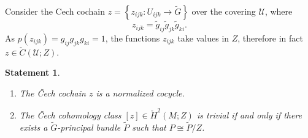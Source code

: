 \documentclass[12pt,letterpaper]{amsart}
\theoremstyle{definition}
\theoremstyle{plain}
\newtheorem{stat}{Statement}
\theoremstyle{remark}
\begin{document}
Consider the Cech cochain $z = \left\{ z_{ijk} : U_{ijk} \to \widetilde{G} \right\}$ over the covering $\mathcal{U}$, where
\begin{equation}
z_{ijk} = \widetilde{g}_{ij} \widetilde{g}_{jk} \widetilde{g}_{ki}.
\label{eq:50}
\end{equation}
As $p(z_{ijk}) = g_{ij} g_{jk} g_{ki} = 1$, the functions $z_{ijk}$ take values in $Z$, therefore in fact $z \in \check{C}(\mathcal{U}; Z)$.
\begin{stat}
\begin{enumerate}
\item
The \v Cech cochain $z$ is a normalized cocycle.
\item
The \v Cech cohomology class $[ z ] \in \check{H}^2(M; Z)$ is trivial if and only if
there exists a $\widetilde{G}$-principal bundle $\widetilde{P}$ such that $P \cong \widetilde{P}/Z$.
\end{enumerate}
\label{stat:6}
\end{stat}
\end{document}

